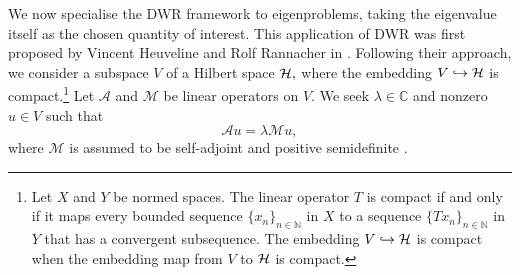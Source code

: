 






We now specialise the DWR framework to eigenproblems, taking the eigenvalue itself as the chosen quantity of interest. 
This application of DWR was first proposed by Vincent Heuveline and Rolf Rannacher in \cite{Heuveline}. 
Following their approach, we consider a subspace $V$ of a Hilbert space $\mathcal{H},$ where the embedding $V  \hookrightarrow \mathcal{H}$ is compact.\footnote{
Let $X$ and $Y$ be normed spaces. The linear operator $T$ is compact if and only if it maps every bounded sequence $\{x_n\}_{n \in \mathbb{N}}$ in $X$ to a sequence  $\{Tx_n\}_{n \in \mathbb{N}}$ in $Y$ that has a convergent subsequence. The embedding $V  \hookrightarrow \mathcal{H}$ is compact when the embedding map from $V$ to $\mathcal{H}$ is compact.} Let $\mathcal{A}$ and $\mathcal{M}$ be linear operators on $V.$
 We seek  $\lambda \in \mathbb{C}$ and nonzero $u \in V$ such that 
\begin{equation} \label{eig prob}
    \mathcal{A}u = \lambda \mathcal{M} u,
\end{equation}
where $\mathcal{M}$ is assumed to be self-adjoint and positive semidefinite  \cite{Bangerth}. 


